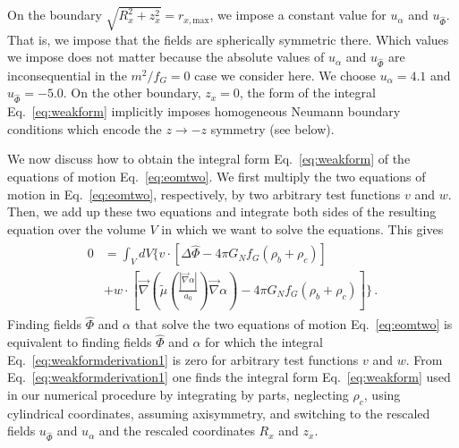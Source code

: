 \documentclass[reprint, amsmath,amssymb, nofootinbib, aps, prd]{revtex4-2}
\begin{document}
On the boundary $\sqrt{R_x^2+z_x^2} = r_{x,\mathrm{max}}$, we impose a constant value for $u_\alpha$ and $u_{\hat{\Phi}}$.
That is, we impose that the fields are spherically symmetric there.
Which values we impose does not matter because the absolute values of $u_\alpha$ and $u_{\hat{\Phi}}$ are inconsequential in the $m^2/f_G = 0$ case we consider here.
We choose $u_\alpha = 4.1$ and $u_{\hat{\Phi}} = -5.0$.
On the other boundary, $z_x = 0$, the form of the integral Eq.~\eqref{eq:weakform} implicitly imposes homogeneous Neumann boundary conditions which encode the $z \to -z$ symmetry (see below).

We now discuss how to obtain the integral form Eq.~\eqref{eq:weakform} of the equations of motion Eq.~\eqref{eq:eomtwo}.
We first multiply the two equations of motion in Eq.~\eqref{eq:eomtwo}, respectively, by two arbitrary test functions $v$ and $w$.
Then, we add up these two equations and integrate both sides of the resulting equation over the volume $V$ in which we want to solve the equations.
This gives
\begin{align}
\label{eq:weakformderivation1}
\begin{split}
 0 &= \int_V dV \Big\{
  v \cdot \left[
    \Delta \hat{\Phi} - 4 \pi G_N f_G (\rho_b + \rho_c)
   \right]\\
 &+ w \cdot \left[
  \vec{\nabla} \left( \tilde{\mu}\left(\frac{|\vec{\nabla} \alpha|}{a_0}\right) \vec{\nabla} \alpha \right) - 4 \pi G_N f_G (\rho_b + \rho_c)
   \right]
   \Bigg\} \,.
\end{split}
\end{align}
Finding fields $\hat{\Phi}$ and $\alpha$ that solve the two equations of motion Eq.~\eqref{eq:eomtwo} is equivalent to finding fields $\hat{\Phi}$ and $\alpha$ for which the integral Eq.~\eqref{eq:weakformderivation1} is zero for arbitrary test functions $v$ and $w$.
From Eq.~\eqref{eq:weakformderivation1} one finds the integral form Eq.~\eqref{eq:weakform} used in our numerical procedure by integrating by parts, neglecting $\rho_c$, using cylindrical coordinates, assuming axisymmetry, and switching to the rescaled fields $u_{\hat{\Phi}}$ and $u_\alpha$ and the rescaled coordinates $R_x$ and $z_x$.
\end{document}
